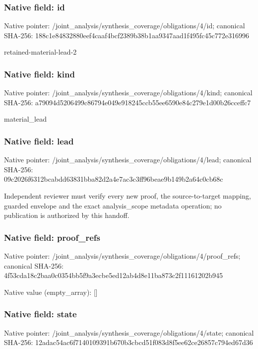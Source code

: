 \documentclass[10pt,a4paper]{article}
\begin{document}
\subsubsection{Native field: id}
Native pointer: /joint\_\allowbreak{}analysis/synthesis\_\allowbreak{}coverage/obligations/4/id; canonical SHA-256: 188c1e84832880eef4caaf4bcf2389b38b1aa9347aad1f495fc45c772e316996

\begingroup\raggedright\sloppy retained-material-lead-2\par\endgroup

\subsubsection{Native field: kind}
Native pointer: /joint\_\allowbreak{}analysis/synthesis\_\allowbreak{}coverage/obligations/4/kind; canonical SHA-256: a79094d5206499c86794e049e918245ccb55ee6590e84c279e1d00b26cceffc7

\begingroup\raggedright\sloppy material\_\allowbreak{}lead\par\endgroup

\subsubsection{Native field: lead}
Native pointer: /joint\_\allowbreak{}analysis/synthesis\_\allowbreak{}coverage/obligations/4/lead; canonical SHA-256: 09c2026f6312bcabdd63831bba82d2a4e7ac3c3ff96beae9b149b2a64c0cb68c

\begingroup\raggedright\sloppy Independent reviewer must verify every new proof,\allowbreak{} the source-to-target mapping,\allowbreak{} guarded envelope and the exact analysis\_\allowbreak{}scope metadata operation;\allowbreak{} no publication is authorized by this handoff.\par\endgroup

\subsubsection{Native field: proof\_\allowbreak{}refs}
Native pointer: /joint\_\allowbreak{}analysis/synthesis\_\allowbreak{}coverage/obligations/4/proof\_\allowbreak{}refs; canonical SHA-256: 4f53cda18c2baa0c0354bb5f9a3ecbe5ed12ab4d8e11ba873c2f11161202b945

Native value (empty\_\allowbreak{}array): []

\subsubsection{Native field: state}
Native pointer: /joint\_\allowbreak{}analysis/synthesis\_\allowbreak{}coverage/obligations/4/state; canonical SHA-256: 12adac54ac6f7140109391b670b3cbcd51f083d8f5ee62ce26857c794ed67d36
\end{document}
